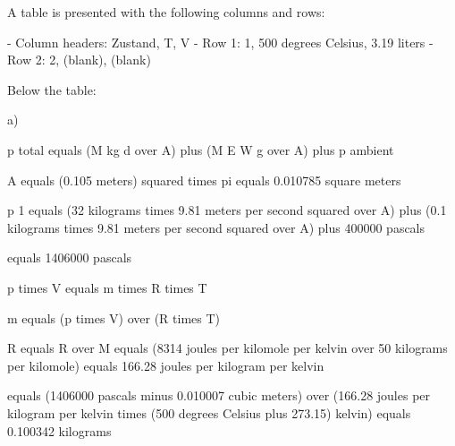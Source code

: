 A table is presented with the following columns and rows:

- Column headers: Zustand, T, V
- Row 1: 1, 500 degrees Celsius, 3.19 liters
- Row 2: 2, (blank), (blank)

Below the table:

a)

p total equals (M kg d over A) plus (M E W g over A) plus p ambient

A equals (0.105 meters) squared times pi equals 0.010785 square meters

p 1 equals (32 kilograms times 9.81 meters per second squared over A) plus (0.1 kilograms times 9.81 meters per second squared over A) plus 400000 pascals

equals 1406000 pascals

p times V equals m times R times T

m equals (p times V) over (R times T)

R equals R over M equals (8314 joules per kilomole per kelvin over 50 kilograms per kilomole) equals 166.28 joules per kilogram per kelvin

equals (1406000 pascals minus 0.010007 cubic meters) over (166.28 joules per kilogram per kelvin times (500 degrees Celsius plus 273.15) kelvin) equals 0.100342 kilograms